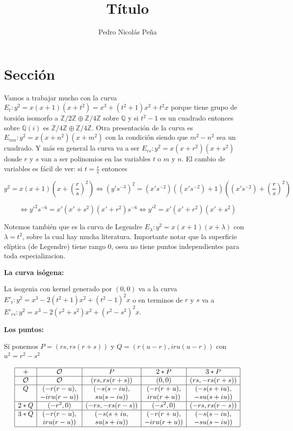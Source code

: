 \documentclass[12pt]{amsart}
\title{Título}
\author{Pedro Nicolás Peña}
\newcommand{\QQ}{\mathbb{Q}}
\newcommand{\ZZ}{\mathbb{Z}}
\newcommand{\OO}{\mathcal{O}}
\newcommand{\leg}[2]{\left( \frac{#1}{#2} \right)}
\newcommand{\lp}{\left(}
\newcommand{\rp}{\right)}
\theoremstyle{plain}
\begin{document}
\maketitle


\section*{Sección}

Vamos a trabajar mucho con la curva $E_t: y^2 = x(x+1)(x+t^2) = x^3+(t^2+1)x^2 + t^2x$ porque tiene grupo de torsión isomorfo a $\ZZ/2\ZZ \oplus \ZZ/4\ZZ$ sobre $\QQ$ y si $t^2-1$ es un cuadrado entonces sobre $\QQ(i)$ es $\ZZ/4\ZZ \oplus \ZZ/4\ZZ$. Otra presentación de la curva es $E_{mn}: y^2 = x(x+n^2)(x+m^2)$ con la condición siendo que $m^2-n^2$ sea un cuadrado. Y más en general la curva va a ser $E_{rs}: y^2 = x(x+r^2)(x+s^2)$ donde $r$ y $s$ van a ser polinomios en las variables $t$ o $m$ y $n$. El cambio de variables es fácil de ver: si $t = \frac{r}{s}$ entonces

\[
y^2 = x(x+1)\lp x+\leg{r}{s}^2\rp \iff {(y's^{-3})}^2 = (x's^{-2})((x's^{-2})+1)\lp (x's^{-2})+\leg{r}{s}^2\rp 
\]

\[
\iff y'^2 s^{-6} = x'(x'+s^2)(x'+r^2) s^{-6} \iff y'^2 = x'(x'+r^2)(x'+s^2)
\]


Notemos también que es la curva de Legendre $E_\lambda : y^2 = x(x+1)(x+\lambda)$ con $\lambda = t^2$, sobre la cual hay mucha literatura. Importante notar que la superficie elíptica (de Legendre) tiene rango 0, osea no tiene puntos independientes para toda especializacion.

\textbf{La  curva isógena:}

La isogenia con kernel generado por $(0,0)$ va a la curva $E'_t: y^2 = x^3-2(t^2+1)x^2+{(t^2-1)}^2x$ o en terminos de $r$ y $s$ va a $E'_{rs}: y^2 = x^3-2(r^2+s^2)x^2+{(r^2-s^2)}^2x$.



\textbf{Los puntos:}

Sí ponemos $P = (rs,rs(r+s))$ y $Q = (r(u-r), iru(u-r))$ con $u^2=r^2-s^2$

\[
\begin{array}{|c|c|c|c|c|}
\hline
+   & \OO    & P      & 2*P    & 3*P \\ \hline

\OO & \OO     & (rs,rs(r+s)) & (0,0)     & (rs,-rs(r+s)) \\ \hline

Q& (-r(r-u),  & (-s(s-iu), & (-r(r+u), & (-s(s+iu), \\

&  -iru(r-u)) & su(s-iu))  & iru(r+u)) & -su(s+iu)) \\ \hline

2*Q& (-r^2,0) & (-rs,-rs(r-s))& (-s^2,0)& (-rs,rs(r-s)) \\ \hline

3*Q & (-r(r-u),& (-s(s+iu, & (-r(r+u), & (-s(s-iu), \\ 

&   iru(r-u)) & su(s+iu)) & -iru(r+u)) & -su(s-iu)) \\ \hline
\end{array}
\]
\end{document}
